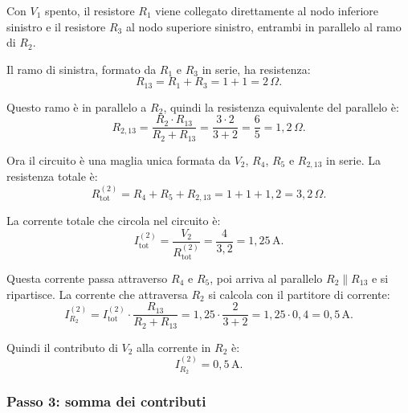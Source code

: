 \begin{esempio}
\begin{center}
\end{center}

Con \(V_1\) spento, il resistore \(R_1\) viene collegato direttamente al nodo inferiore sinistro e il resistore \(R_3\) al nodo superiore sinistro, entrambi in parallelo al ramo di \(R_2\).

Il ramo di sinistra, formato da \(R_1\) e \(R_3\) in serie, ha resistenza:
\[
R_{13} = R_1 + R_3 = 1 + 1 = 2\,\Omega.
\]

Questo ramo è in parallelo a \(R_2\), quindi la resistenza equivalente del parallelo è:
\[
R_{2,13} = \frac{R_2 \cdot R_{13}}{R_2 + R_{13}} = \frac{3 \cdot 2}{3 + 2} = \frac{6}{5} = 1{,}2\,\Omega.
\]

Ora il circuito è una maglia unica formata da \(V_2\), \(R_4\), \(R_5\) e \(R_{2,13}\) in serie. La resistenza totale è:
\[
R_{\text{tot}}^{(2)} = R_4 + R_5 + R_{2,13} = 1 + 1 + 1{,}2 = 3{,}2\,\Omega.
\]

La corrente totale che circola nel circuito è:
\[
I_{\text{tot}}^{(2)} = \frac{V_2}{R_{\text{tot}}^{(2)}} = \frac{4}{3{,}2} = 1{,}25\,\text{A}.
\]

Questa corrente passa attraverso \(R_4\) e \(R_5\), poi arriva al parallelo \(R_2 \parallel R_{13}\) e si ripartisce. La corrente che attraversa \(R_2\) si calcola con il partitore di corrente:
\[
I_{R_2}^{(2)} = I_{\text{tot}}^{(2)} \cdot \frac{R_{13}}{R_2 + R_{13}} = 1{,}25 \cdot \frac{2}{3 + 2} = 1{,}25 \cdot 0{,}4 = 0{,}5\,\text{A}.
\]

Quindi il contributo di \(V_2\) alla corrente in \(R_2\) è:
\[
I_{R_2}^{(2)} = 0{,}5\,\text{A}.
\]

\subsubsection*{Passo 3: somma dei contributi}


\end{esempio}
